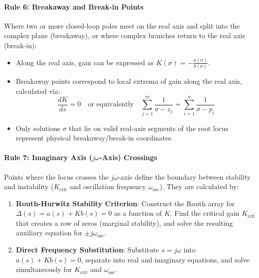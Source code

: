 \documentclass[12pt,onecolumn,twoside ]{article}
\begin{document}
	\paragraph{Rule 6: Breakaway and Break-in Points}
	Where two or more closed-loop poles meet on the real axis and split into the complex plane (breakaway), or where complex branches return to the real axis (break-in):
	\begin{itemize}
		\item
		Along the real axis, gain can be expressed as $K(\sigma) = -\frac{a(\sigma)}{b(\sigma)}$.
		\item
		Breakaway points correspond to local extrema of gain along the real axis, calculated via: \[
		\frac{dK}{ds} = 0 \quad \text{or equivalently} \quad \sum_{j=1}^{m} \frac{1}{\sigma - z_j} = \sum_{i=1}^{n} \frac{1}{\sigma - p_i}
		\]
		\item
		Only solutions $\sigma$ that lie on valid real-axis segments of the root locus represent physical breakaway/break-in coordinates.
	\end{itemize}
	\paragraph{Rule 7: Imaginary Axis ($j\omega$-Axis) Crossings}
	Points where the locus crosses the $j\omega$-axis define the boundary between stability and instability ($K_{\text{crit}}$ and oscillation frequency $\omega_{\text{osc}}$). They are calculated by:
	\begin{enumerate}
		\item
		\textbf{Routh-Hurwitz Stability Criterion}: Construct the Routh array for $\Delta(s) = a(s) + K b(s) = 0$ as a function of $K$. Find the critical gain $K_{\text{crit}}$ that creates a row of zeros (marginal stability), and solve the resulting auxiliary equation for $\pm j\omega_{\text{osc}}$.
		\item
		\textbf{Direct Frequency Substitution}: Substitute $s = j\omega$ into $a(s) + K b(s) = 0$, separate into real and imaginary equations, and solve simultaneously for $K_{\text{crit}}$ and $\omega_{\text{osc}}$.
	\end{enumerate}
	
\end{document}
